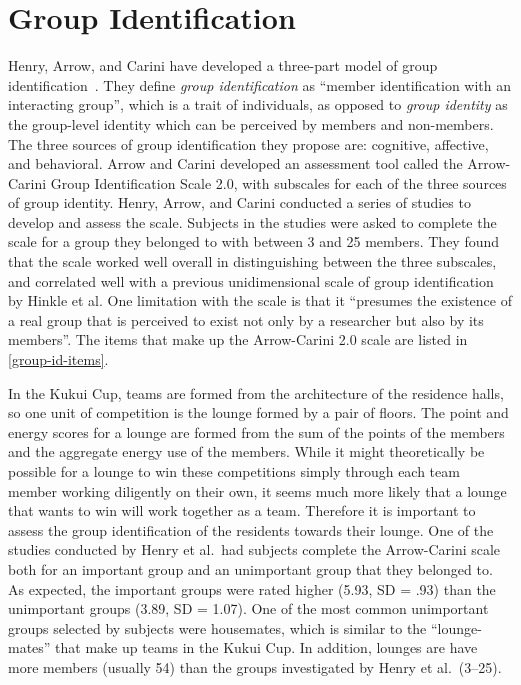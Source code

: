 \section{Group Identification}

Henry, Arrow, and Carini have developed a three-part model of group identification~\cite{Henry1999}. They define \emph{group identification} as ``member identification with an interacting group'', which is a trait of individuals, as opposed to \emph{group identity} as the group-level identity which can be perceived by members and non-members. The three sources of group identification they propose are: cognitive, affective, and behavioral. Arrow and Carini developed an assessment tool called the Arrow-Carini Group Identification Scale 2.0, with subscales for each of the three sources of group identity. Henry, Arrow, and Carini conducted a series of studies to develop and assess the scale. Subjects in the studies were asked to complete the scale for a group they belonged to with between 3 and 25 members. They found that the scale worked well overall in distinguishing between the three subscales, and correlated well with a previous unidimensional scale of group identification by Hinkle et al. One limitation with the scale is that it ``presumes the existence of a real group that is perceived to exist not only by a researcher but also by its members''. The items that make up the Arrow-Carini 2.0 scale are listed in \autoref{group-id-items}.

In the Kukui Cup, teams are formed from the architecture of the residence halls, so one unit of competition is the lounge formed by a pair of floors. The point and energy scores for a lounge are formed from the sum of the points of the members and the aggregate energy use of the members. While it might theoretically be possible for a lounge to win these competitions simply through each team member working diligently on their own, it seems much more likely that a lounge that wants to win will work together as a team. Therefore it is important to assess the group identification of the residents towards their lounge. One of the studies conducted by Henry et al.\ had subjects complete the Arrow-Carini scale both for an important group and an unimportant group that they belonged to. As expected, the important groups were rated higher (5.93, SD = .93) than the unimportant groups (3.89, SD = 1.07). One of the most common unimportant groups selected by subjects were housemates, which is similar to the ``lounge-mates'' that make up teams in the Kukui Cup. In addition, lounges are have more members (usually 54) than the groups investigated by Henry et al.\ (3--25).


